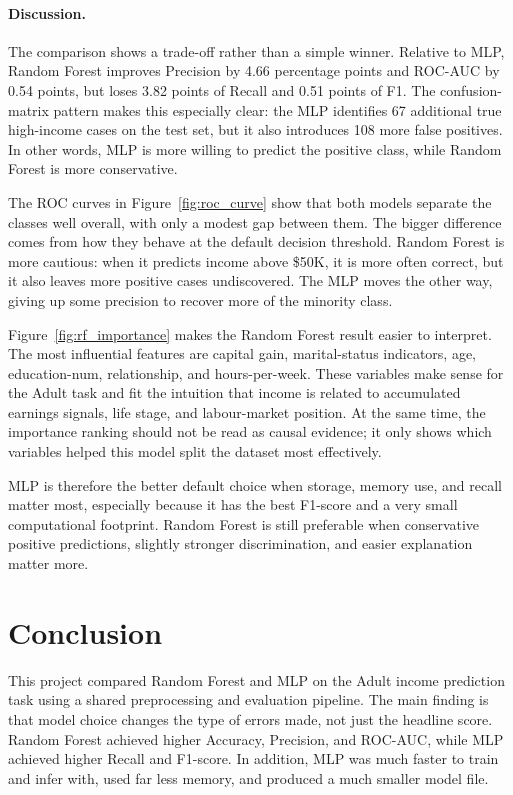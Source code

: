 \documentclass[10pt,twocolumn,letterpaper]{article}
\begin{document}
\paragraph{Discussion.}
The comparison shows a trade-off rather than a simple winner. Relative to MLP, Random Forest improves Precision by 4.66 percentage points and ROC-AUC by 0.54 points, but loses 3.82 points of Recall and 0.51 points of F1. The confusion-matrix pattern makes this especially clear: the MLP identifies 67 additional true high-income cases on the test set, but it also introduces 108 more false positives. In other words, MLP is more willing to predict the positive class, while Random Forest is more conservative.

The ROC curves in Figure~\ref{fig:roc_curve} show that both models separate the classes well overall, with only a modest gap between them. The bigger difference comes from how they behave at the default decision threshold. Random Forest is more cautious: when it predicts income above \$50K, it is more often correct, but it also leaves more positive cases undiscovered. The MLP moves the other way, giving up some precision to recover more of the minority class.

Figure~\ref{fig:rf_importance} makes the Random Forest result easier to interpret. The most influential features are capital gain, marital-status indicators, age, education-num, relationship, and hours-per-week. These variables make sense for the Adult task and fit the intuition that income is related to accumulated earnings signals, life stage, and labour-market position. At the same time, the importance ranking should not be read as causal evidence; it only shows which variables helped this model split the dataset most effectively.

MLP is therefore the better default choice when storage, memory use, and recall matter most, especially because it has the best F1-score and a very small computational footprint. Random Forest is still preferable when conservative positive predictions, slightly stronger discrimination, and easier explanation matter more.

\section{Conclusion}
This project compared Random Forest and MLP on the Adult income prediction task using a shared preprocessing and evaluation pipeline. The main finding is that model choice changes the type of errors made, not just the headline score. Random Forest achieved higher Accuracy, Precision, and ROC-AUC, while MLP achieved higher Recall and F1-score. In addition, MLP was much faster to train and infer with, used far less memory, and produced a much smaller model file.
\end{document}

